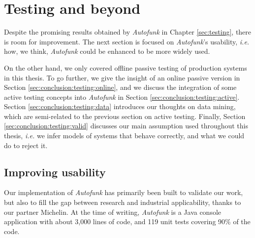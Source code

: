 \section{Testing and beyond}
\label{sec:conclusion:testing}

Despite the promising results obtained by \textit{Autofunk} in
Chapter \ref{sec:testing}, there is room for improvement. The
next section is focused on \textit{Autofunk}'s usability,
\emph{i.e.} how, we think, \textit{Autofunk} could be enhanced to
be more widely used.

On the other hand, we only covered offline passive testing of
production systems in this thesis. To go further, we give the
insight of an online passive version in Section
\ref{sec:conclusion:testing:online}, and we discuss the
integration of some active testing concepts into
\textit{Autofunk} in Section \ref{sec:conclusion:testing:active}.
Section \ref{sec:conclusion:testing:data} introduces our thoughts
on data mining, which are semi-related to the previous section on
active testing. Finally, Section
\ref{sec:conclusion:testing:valid} discusses our main assumption
used throughout this thesis, \emph{i.e.} we infer models of
systems that behave correctly, and what we could do to reject it.


\subsection{Improving usability}

Our implementation of \textit{Autofunk} has primarily been built
to validate our work, but also to fill the gap between research
and industrial applicability, thanks to our partner Michelin. At
the time of writing, \emph{Autofunk} is a Java console
application with about 3,000 lines of code, and 119 unit tests
covering 90\% of the code.

